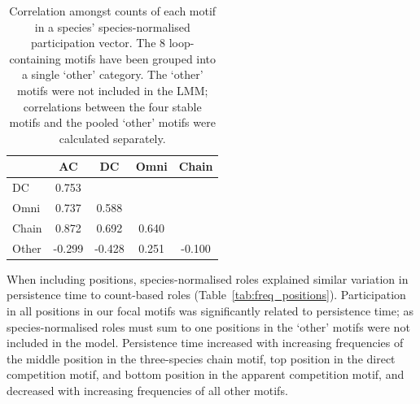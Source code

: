 \documentclass[12pt]{article}
\begin{document}
		\begin{table}[hb!]
    		\caption{Correlation amongst counts of each motif in a species' species-normalised participation vector. The 8 loop-containing motifs have been grouped into a single `other' category. The `other' motifs were not included in the LMM; correlations between the four stable motifs and the pooled `other' motifs were calculated separately.}
    		\label{tab:freq_correlations}
    		\begin{tabular}{l | c c c c}
    			& AC & DC & Omni & Chain \\
    		\hline
    		DC    &  0.753 &       & & \\         
    		Omni  &  0.737 &  0.588 &   & \\   
    		Chain &  0.872 &  0.692 & 0.640 & \\
    		Other & -0.299 & -0.428 & 0.251 & -0.100 \\
    		\hline
    		\end{tabular}
    		\end{table}

        
        When including positions, species-normalised roles explained similar variation in persistence time to count-based roles (Table~\ref{tab:freq_positions}).
        Participation in all positions in our focal motifs was significantly related to persistence time; as species-normalised roles must sum to one positions in the `other' motifs were not included in the model.
        Persistence time increased with increasing frequencies of the middle position in the three-species chain motif, top position in the direct competition motif, and bottom position in the apparent competition motif, and decreased with increasing frequencies of all other motifs.
        
\end{document}
